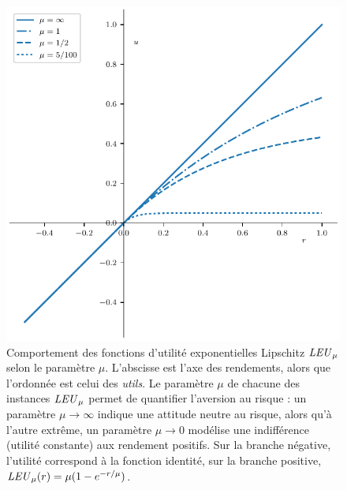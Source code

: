 \begin{figure}[ht]
  \centering
  \includegraphics[width=\textwidth]{../experiments/fig/leus.pdf}
  \caption[Utilités LEU]{Comportement des fonctions d'utilité exponentielles Lipschitz
    $\mbox{\textit{LEU}}_\mu$ selon le paramètre $\mu$. L'abscisse est l'axe des rendements, alors que
    l'ordonnée est celui des \textit{utils}. Le paramètre $\mu$ de chacune des instances
    $\mbox{\textit{LEU}}_\mu$ permet de quantifier l'aversion au risque : un paramètre $\mu\to\infty$ indique une
    attitude neutre au risque, alors qu'à l'autre extrême, un paramètre $\mu\to0$ modélise une
    indifférence (utilité constante) aux rendement positifs. Sur la branche négative,
    l'utilité correspond à la fonction identité, sur la branche positive,
    $\mbox{\textit{LEU}}_\mu(r) = \mu(1-e^{-r/\mu})$.}
  \label{fig_leus}
\end{figure}

